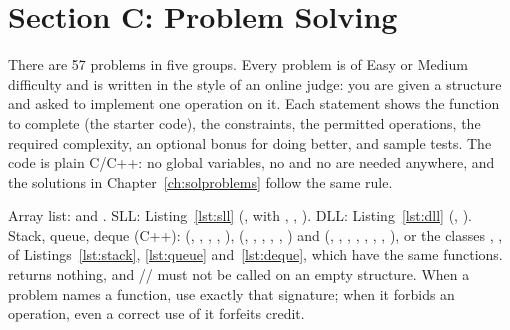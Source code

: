 \chapter{Section C: Problem Solving}\label{ch:problems}

There are 57 problems in five groups. Every problem is of Easy or Medium difficulty and
is written in the style of an online judge: you are given a structure and asked to
implement one operation on it. Each statement shows the function to complete (the
starter code), the constraints, the permitted operations, the required complexity, an
optional bonus for doing better, and sample tests. The code is plain C/C++: no global
variables, no  and no  are needed anywhere, and the solutions in
Chapter~\ref{ch:solproblems} follow the same rule.

 Array list:  and . SLL:
Listing~\ref{lst:sll} (,  with , , ). DLL:
Listing~\ref{lst:dll} (, ). Stack, queue, deque (C++): 
(, , , , ),  (,
, , , , ) and 
(, , , , ,
, , ), or the classes , ,  of
Listings~\ref{lst:stack}, \ref{lst:queue} and~\ref{lst:deque}, which have the same
functions.  returns nothing, and // must not be called
on an empty structure. When a problem names a function, use exactly
that signature; when it forbids an operation, even a correct use of it forfeits credit.







